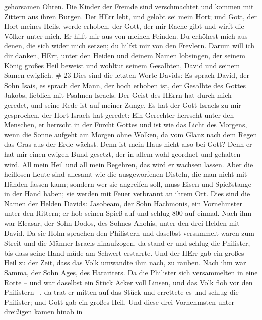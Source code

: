 gehorsamen Ohren.  Die Kinder der Fremde sind verschmachtet
und kommen mit Zittern aus ihren Burgen.  Der HErr lebt,
und gelobt sei mein Hort; und Gott, der Hort meines Heils, werde
erhoben,  der Gott, der mir Rache gibt und wirft die Völker
unter mich.  Er hilft mir aus von meinen Feinden. Du
erhöhest mich aus denen, die sich wider mich setzen; du hilfst mir von
den Frevlern.  Darum will ich dir danken, HErr, unter den
Heiden und deinem Namen lobsingen,  der seinem König großes
Heil beweist und wohltut seinem Gesalbten, David und seinem Samen
ewiglich. \# 23  Dies sind die letzten Worte Davids: Es
sprach David, der Sohn Isais, es sprach der Mann, der hoch erhoben ist,
der Gesalbte des Gottes Jakobs, lieblich mit Psalmen Israels.
 Der Geist des HErrn hat durch mich geredet, und seine Rede
ist auf meiner Zunge.  Es hat der Gott Israels zu mir
gesprochen, der Hort Israels hat geredet: Ein Gerechter herrscht unter
den Menschen, er herrscht in der Furcht Gottes  und ist wie
das Licht des Morgens, wenn die Sonne aufgeht am Morgen ohne Wolken, da
vom Glanz nach dem Regen das Gras aus der Erde wächst.  Denn
ist mein Haus nicht also bei Gott? Denn er hat mir einen ewigen Bund
gesetzt, der in allem wohl geordnet und gehalten wird. All mein Heil und
all mein Begehren, das wird er wachsen lassen.  Aber die
heillosen Leute sind allesamt wie die ausgeworfenen Disteln, die man
nicht mit Händen fassen kann;  sondern wer sie angreifen
soll, muss Eisen und Spießstange in der Hand haben; sie werden mit Feuer
verbrannt an ihrem Ort.  Dies sind die Namen der Helden
Davids: Jasobeam, der Sohn Hachmonis, ein Vornehmster unter den Rittern;
er hob seinen Spieß auf und schlug 800 auf einmal.  Nach ihm
war Eleasar, der Sohn Dodos, des Sohnes Ahohis, unter den drei Helden
mit David. Da sie Hohn sprachen den Philistern und daselbst versammelt
waren zum Streit und die Männer Israels hinaufzogen,  da
stand er und schlug die Philister, bis dass seine Hand müde am Schwert
erstarrte. Und der HErr gab ein großes Heil zu der Zeit, dass das Volk
umwandte ihm nach, zu rauben.  Nach ihm war Samma, der Sohn
Ages, des Harariters. Da die Philister sich versammelten in eine Rotte
-- und war daselbst ein Stück Acker voll Linsen, und das Volk floh vor
den Philistern --,  da trat er mitten auf das Stück und
errettete es und schlug die Philister; und Gott gab ein großes Heil.
 Und diese drei Vornehmsten unter dreißigen kamen hinab in
